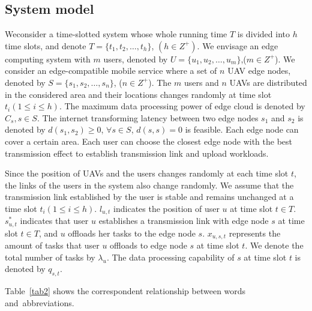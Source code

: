 \documentclass[journal,article,submit,pdftex,moreauthors]{Definitions/mdpi}
\begin{document}
\subsection{System model}
Weconsider a time-slotted system whose whole running time $T$ is divided into $h$ time slots, and denote $T=\{t_1,t_2,\dots,t_h\}$, $(h \in Z^+)$. We envisage an edge computing system with $m$ users, denoted by $U=\{u_1,u_2,\dots,u_m\}$,($m \in Z^+$). We consider an edge-compatible mobile service where a set of  $n$ UAV edge nodes,  denoted by $S=\{s_1,s_2,\dots,s_n\}$, ($n \in Z^+$). The $m$ users and $n$ UAVs are distributed in the considered area  and their locations changes randomly at time slot $t_i(1 \le i \le h)$. The maximum data processing power of edge cloud is denoted by $C_s, s\in S$. The internet transforming latency between two edge nodes $s_1$ and $s_2$ is denoted by  $d(s_1,s_2)\ge 0$,  $\forall s\in S$, $d(s,s)=0$ is feasible. Each edge node  can cover a certain area. Each user can choose the closest edge node with the best transmission effect to establish transmission link and upload workloads. 

Since the position of UAVs and the users changes randomly at each time slot $t$, the links of the users in the system also change randomly. We assume that the transmission link established by the user is stable and remains unchanged at a time slot $t_i(1 \le i \le h)$. $l_{u,t}$ indicates the position of user $u$ at time slot $t \in T$. $s_{u,t}^{*}$ indicates that user $u$ establishes a transmission link with edge node $s$ at time slot $t\in T$, and $u$ offloads her tasks to the edge node $s$. $x_{u,s,t}$ represents the amount of tasks that user $u$ offloads to edge node $s$ at time slot $t$. We denote the total number of tasks by $\lambda_u$. The data processing capability of $s$ at time slot $t$ is denoted by $q_{s,t}$.   

 Table~\ref{tab2} shows the correspondent relationship between words and~abbreviations.
\end{document}
